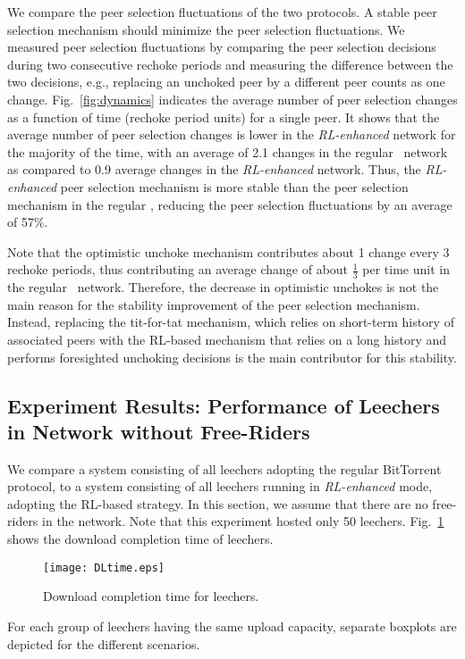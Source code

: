 We compare the peer selection fluctuations of the two protocols.
A stable peer selection mechanism should minimize the peer selection 
fluctuations. We measured peer selection fluctuations by comparing the peer 
selection decisions during two consecutive rechoke periods and measuring the 
difference between the two decisions, e.g., replacing an unchoked peer by a 
different peer counts as one change.
Fig.~\ref{fig:dynamics} indicates the average number of peer selection 
changes as a function of time (rechoke period units) for a single peer. 
It shows that the average number of peer selection changes is lower in the 
\emph{RL-enhanced} network for the majority of the time, with an average of 2.1 
changes in the regular \BT~network as compared to 0.9 average changes in the 
\emph{RL-enhanced} network. Thus, the \emph{RL-enhanced} peer selection 
mechanism is more stable than the peer selection mechanism in the regular \BT, reducing the peer selection fluctuations by an average of 57\%.

Note that the optimistic unchoke mechanism contributes about 1 change 
every 3 rechoke periods, thus contributing an average change of about 
$\frac{1}{3}$ per time unit in the regular \BT~network. Therefore, the decrease 
in optimistic unchokes is not the main reason for the stability improvement of 
the peer selection mechanism. 
Instead, replacing the tit-for-tat mechanism, which relies on short-term 
history of associated peers with the RL-based mechanism that 
relies on a long history and performs foresighted unchoking decisions is the 
main contributor for this stability.

\subsection{Experiment Results: Performance of Leechers in Network without
Free-Riders}


We compare a system consisting of all leechers adopting the regular BitTorrent 
protocol, to a system consisting of all leechers running in \emph{RL-enhanced} mode, adopting the RL-based strategy.  
In this section, we assume that there are no free-riders in the network. 
Note that this experiment hosted only 50 leechers. 
Fig.~\ref{fig:DLtime} shows the download completion time of leechers.
\begin{figure}[t]
\centering
\texttt{[image: DLtime.eps]}
\caption{Download completion time for leechers.} 
\label{fig:DLtime}
\end{figure}
For each group of leechers having the same upload capacity, separate boxplots 
are depicted for the different scenarios.


